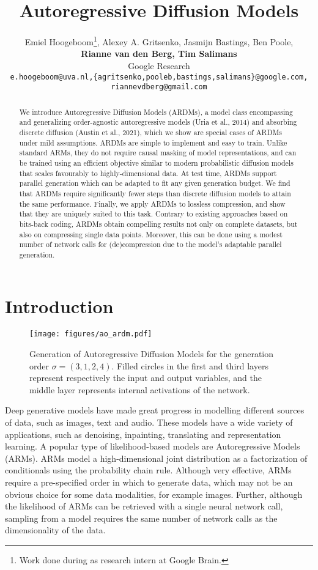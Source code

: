 \documentclass{article} \usepackage{iclr2022_conference,times}
\title{Autoregressive Diffusion Models}
\author{Emiel Hoogeboom\thanks{Work done during as research intern at Google Brain.}, Alexey A. Gritsenko, Jasmijn Bastings, Ben Poole, \\ \textbf{Rianne van den Berg, Tim Salimans} \\
Google Research \\
\texttt{e.hoogeboom@uva.nl,\{agritsenko,pooleb,bastings,salimans\}@google.com,} \\ \texttt{riannevdberg@gmail.com}
}
\begin{document}
\maketitle

\begin{abstract}
We introduce Autoregressive Diffusion Models (ARDMs), a model class encompassing and generalizing order-agnostic autoregressive models (Uria et al., 2014) and absorbing discrete diffusion (Austin et al., 2021), which we show are special cases of ARDMs under mild assumptions. ARDMs are simple to implement and easy to train. Unlike standard ARMs, they do not require causal masking of model representations, and can be trained using an efficient objective similar to modern probabilistic diffusion models that scales favourably to highly-dimensional data. At test time, ARDMs support parallel generation which can be adapted to fit any given generation budget. We find that ARDMs require significantly fewer steps than discrete diffusion models to attain the same performance. Finally, we apply ARDMs to lossless compression, and show that they are uniquely suited to this task. Contrary to existing approaches based on bits-back coding, ARDMs obtain compelling results not only on complete datasets, but also on compressing single data points. Moreover, this can be done using a modest number of network calls for (de)compression due to the model's adaptable parallel generation. \end{abstract}

\section{Introduction}

\begin{figure}[b]
    \centering
    \vspace{-.3cm}
    \texttt{[image: figures/ao\_ardm.pdf]}
    \vspace{-.25cm}
    \caption{Generation of Autoregressive Diffusion Models for the generation order $\sigma= (3, 1, 2, 4)$. Filled circles in the first and third layers represent respectively the input and output variables, and the middle layer represents internal activations of the network.}
    \label{fig:overview}
\end{figure}
Deep generative models have made great progress in modelling different sources of data, such as images, text and audio. These models have a wide variety of applications, such as denoising, inpainting, translating and representation learning. A popular type of likelihood-based models are Autoregressive Models (ARMs). ARMs model a high-dimensional joint distribution as a factorization of conditionals using the probability chain rule. Although very effective, ARMs require a pre-specified order in which to generate data, which may not be an obvious choice for some data modalities, for example images. Further, although the likelihood of ARMs can be retrieved with a single neural network call, sampling from a model requires the same number of network calls as the dimensionality of the data.
\end{document}
